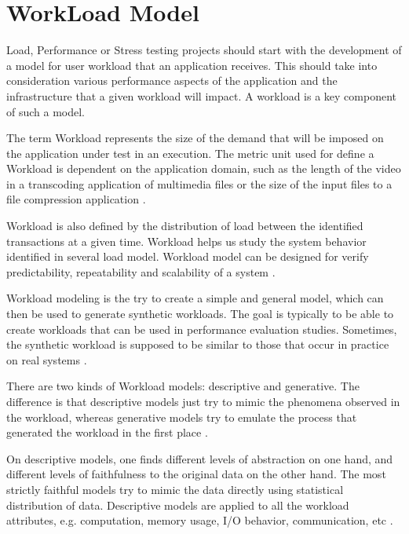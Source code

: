 \section{WorkLoad Model}

Load, Performance or Stress testing projects should start with the development of a model for user workload that an application receives. This should take into consideration various performance aspects of the application and the infrastructure that a given workload will impact. A workload is a key component of such a model.

The term Workload represents  the size of the demand that will be imposed on the application under test in an execution. The metric unit used for define a Workload is dependent on the application domain, such as the length of the video in a transcoding application of multimedia files or the size of the input files to a file compression application \cite{Feitelson2013} \cite{Molyneaux2009} \cite{Goncalves2014}. 

Workload is also defined by the distribution of load between the identified transactions at a given time. Workload helps us study the system behavior identified in several load model. Workload model can be designed for verify predictability, repeatability and scalability of a system \cite{Feitelson2013} \cite{Molyneaux2009}.


Workload modeling is the try to create a simple and general model, which can
then be used to generate synthetic workloads. The goal is typically to be able to create workloads that can
be used in performance evaluation studies. Sometimes, the synthetic workload is supposed to be
similar to those that occur in practice on real systems \cite{Feitelson2013} \cite{Molyneaux2009}.

There are two kinds of Workload models: descriptive and generative. The difference is that descriptive models just try to mimic the phenomena observed in the workload, whereas generative models try to emulate the process that generated the workload in the first place \cite{DiLucca2006}. 

On descriptive models, one finds different levels of abstraction on one hand, and different levels of faithfulness to the original data on the other hand. The
most strictly faithful models try to mimic the data directly using statistical distribution of data.  Descriptive models are applied to all the workload attributes, e.g. computation, memory usage, I/O behavior, communication, etc \cite{DiLucca2006}. 


